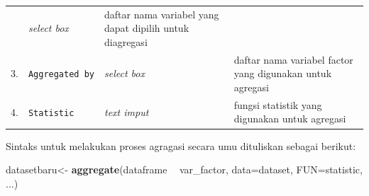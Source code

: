 \documentclass[12pt,]{krantz}
\newenvironment{Shaded}{\begin{snugshade}}{\end{snugshade}}
\newcommand{\DataTypeTok}[1]{\textcolor[rgb]{0.13,0.29,0.53}{#1}}
\newcommand{\KeywordTok}[1]{\textcolor[rgb]{0.13,0.29,0.53}{\textbf{#1}}}
\newcommand{\NormalTok}[1]{#1}
\newcommand{\OperatorTok}[1]{\textcolor[rgb]{0.81,0.36,0.00}{\textbf{#1}}}
\newcommand{\StringTok}[1]{\textcolor[rgb]{0.31,0.60,0.02}{#1}}
\begin{document}
\begin{longtable}[]{@{}llll@{}}
\begin{minipage}[t]{0.15\columnwidth}
\end{minipage} & \begin{minipage}[t]{0.09\columnwidth}\raggedright
\emph{select box}\strut
\end{minipage} & \begin{minipage}[t]{0.60\columnwidth}\raggedright
daftar nama variabel yang dapat dipilih untuk diagregasi\strut
\end{minipage}\tabularnewline
\begin{minipage}[t]{0.04\columnwidth}\raggedright
3.\strut
\end{minipage} & \begin{minipage}[t]{0.15\columnwidth}\raggedright
\texttt{Aggregated\ by}\strut
\end{minipage} & \begin{minipage}[t]{0.09\columnwidth}\raggedright
\emph{select box}\strut
\end{minipage} & \begin{minipage}[t]{0.60\columnwidth}\raggedright
daftar nama variabel factor yang digunakan untuk agregasi\strut
\end{minipage}\tabularnewline
\begin{minipage}[t]{0.04\columnwidth}\raggedright
4.\strut
\end{minipage} & \begin{minipage}[t]{0.15\columnwidth}\raggedright
\texttt{Statistic}\strut
\end{minipage} & \begin{minipage}[t]{0.09\columnwidth}\raggedright
\emph{text imput}\strut
\end{minipage} & \begin{minipage}[t]{0.60\columnwidth}\raggedright
fungsi statistik yang digunakan untuk agregasi\strut
\end{minipage}\tabularnewline
\bottomrule
\end{longtable}

Sintaks untuk melakukan proses agragasi secara umu dituliskan sebagai berikut:

\begin{Shaded}
\begin{Highlighting}[]
\NormalTok{datasetbaru<-}\StringTok{ }\KeywordTok{aggregate}\NormalTok{(dataframe }\OperatorTok{~}\StringTok{ }\NormalTok{var_factor, }
                        \DataTypeTok{data=}\NormalTok{dataset, }\DataTypeTok{FUN=}\NormalTok{statistic, ...)}
\end{Highlighting}
\end{Shaded}
\end{document}
